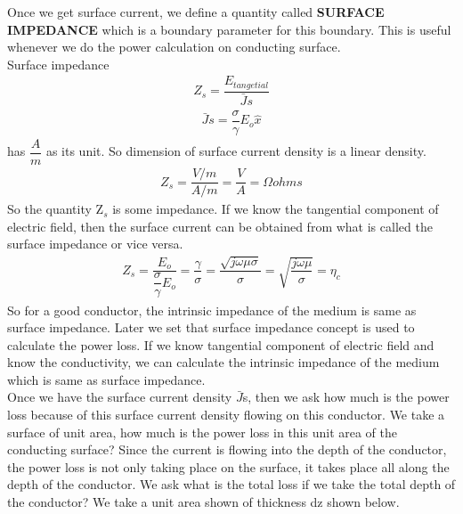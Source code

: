 Once we get surface current, we define a quantity called \textbf{SURFACE IMPEDANCE} which is a boundary parameter for this boundary. This is useful whenever we do the power calculation on conducting surface.\\
Surface impedance
\begin{align}
Z_{s}=\dfrac{E_{tangetial}}{\bar{J}s}
\end{align}
\begin{align}
\bar{J}s=\dfrac{\sigma}{\gamma}E_{o}\hat{x}
\end{align}
has $\dfrac{A}{m}$ as its unit. So dimension of surface current density is a linear density.
\begin{align}
Z_{s}=\dfrac{V/m}{A/m}=\dfrac{V}{A}=\Omega ohms
\end{align}
So the quantity Z$_{s}$ is some impedance. If we know the tangential component of electric field, then the surface current can be obtained from what is called the surface impedance or vice versa.\\
\begin{align}
Z_{s}=\dfrac{E_{o}}{\dfrac{\sigma}{\gamma} E_{o}}=\dfrac{\gamma}{\sigma}=\dfrac{\sqrt{j\omega\mu\sigma}}{\sigma}=\sqrt{\dfrac{j\omega\mu}{\sigma}}=\eta_{c}
\end{align}
So for a good conductor, the intrinsic impedance of the medium is same as surface impedance. Later we set that surface impedance concept is used to calculate the power loss. If we know tangential component of electric field and know the conductivity, we can calculate the intrinsic impedance of the medium which is same as surface impedance.\\
Once we have the surface current density $\bar{J}$s, then we ask how much is the power loss because of this surface current density flowing on this conductor. We take a surface of unit area, how much is the power loss in this unit area of the conducting surface? Since the current is flowing into the depth of the conductor, the power loss is not only taking place on the surface, it takes place all along the depth of the conductor. We ask what is the total loss if we take the total depth of the conductor? We take a unit area shown of thickness dz shown below.

